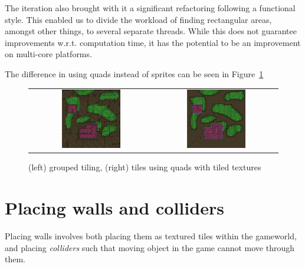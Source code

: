 The iteration also brought with it a significant refactoring following a
functional style. This enabled us to divide the workload of finding rectangular
areas, amongst other things, to several separate threads. While this does not
guarantee improvements w.r.t. computation time, it has the potential to be an
improvement on multi-core platforms.

The difference in using quads instead of sprites can be seen
in Figure~\ref{fig:quad_tiling_comparison}

\begin{figure}[H]
    \centering
    \begin{tabular}{cc}
        \includegraphics[width=0.5\textwidth]{figures/generating_levels/grouped-tile.png}
        &
        \includegraphics[width=0.5\textwidth]{figures/generating_levels/quad-tile.png}
    \end{tabular}
    \caption{(left) grouped tiling, (right) tiles using quads with tiled
    textures}\label{fig:quad_tiling_comparison}
\end{figure}

\section{Placing walls and colliders}
Placing walls involves both placing them as textured tiles within the gameworld, and placing \textit{colliders} such that moving object in the game cannot move through them.

